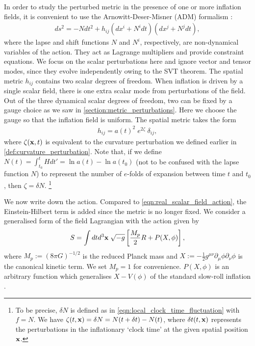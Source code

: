 In order to study the perturbed metric in the presence of one or more inflation fields, it is convenient to use the Arnowitt-Deser-Misner (ADM) formalism \cite{Arnowitt2008ADMrepublication}:
\begin{align}
	ds^2 = -N dt^2 + h_{ij}(dx^i + N^i dt) (dx^j + N^j dt),
\end{align}
where the lapse and shift functions $N$ and $N^i$, respectively, are non-dynamical variables of the action. They act as Lagrange multipliers and provide constraint equations. We focus on the scalar perturbations here and ignore vector and tensor modes, since they evolve independently owing to the SVT theorem. The spatial metric $h_{ij}$ contains two scalar degrees of freedom. When inflation is driven by a single scalar field, there is one extra scalar mode from perturbations of the field. Out of the three dynamical scalar degrees of freedom, two can be fixed by a gauge choice as we saw in \ref{section:metric_perturbations}. Here we choose the gauge so that the inflation field is uniform. The spatial metric takes the form
\begin{align}
	h_{ij} = a(t)^2 \;e^{2\zeta} \; \delta_{ij},  \label{eqn:spatial_metric_curvature_perturbation}
\end{align}
where $\zeta(\mathbf{x},t)$ is equivalent to the curvature perturbation we defined earlier in \eqref{def:curvature_perturbation}. Note that, if we define $N(t) = \int^{t}_{t_0} H dt' = \ln a(t) - \ln a(t_0)$ (not to be confused with the lapse function $N$) to represent the number of $e$-folds of expansion between time $t$ and $t_0$, then $\zeta = \delta N$. \footnote{To be precise, $\delta N$ is defined as in \eqref{eqn:local_clock_time_fluctuation} with $f=N$. We have $\zeta(t,\mathbf{x})= \delta N = N(t+\delta t) - N(t)$, where $\delta t(t,\mathbf{x})$ represents the perturbations in the inflationary `clock time' at the given spatial position $\mathbf{x}$.}
	
We now write down the action. Compared to \eqref{eqn:real_scalar_field_action}, the Einstein-Hilbert term is added since the metric is no longer fixed. We consider a generalised form of the field Lagrangian with the action given by
\begin{align}
	S = \int dt d^3 \mathbf{x} \; \sqrt{-g} \left[ \frac{M_p}{2} R + P(X,\phi) \right],  \label{eqn:general_single_field_action}
\end{align}
where $M_p := (8\pi G)^{-1/2}$ is the reduced Planck mass and $X:=-\frac{1}{2} g^{\mu\nu} \partial_\mu \phi \partial_\nu \phi$ is the canonical kinetic term. We set $M_p=1$ for convenience. $P(X,\phi)$ is an arbitrary function which generalises $X-V(\phi)$ of the standard slow-roll inflation \cite{Chen2007b}.

